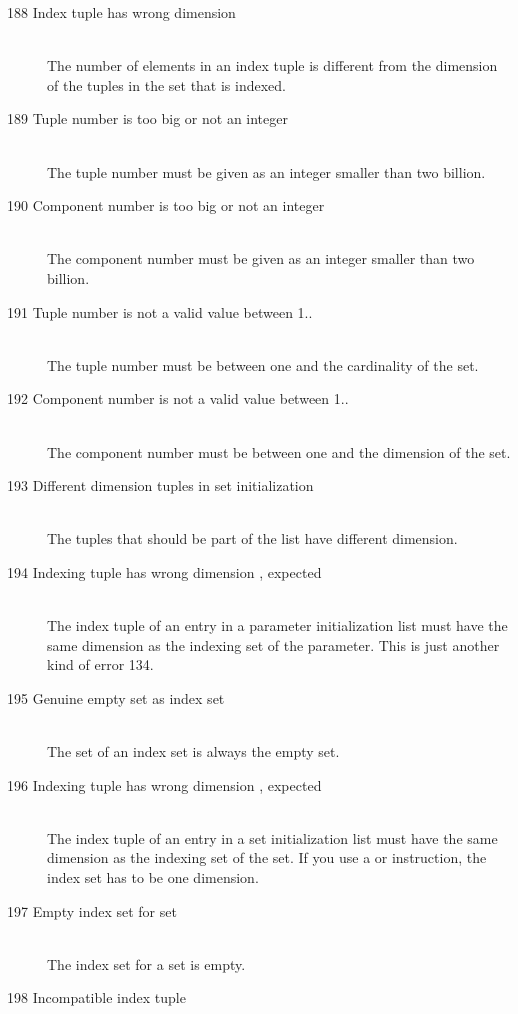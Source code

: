 \begin{description}
\item[188 Index tuple has wrong dimension]\ \\
   The number of elements in an index tuple is different from the
   dimension of the tuples in the set that is indexed.
\item[189 Tuple number  is too big or not an integer]\ \\
  The tuple number must be given as an integer smaller than two
  billion.
\item[190 Component number  is too big or not an integer]\ \\
  The component number must be given as an integer smaller than two
  billion.
\item[191 Tuple number  is not a valid value between 1..]\ \\
  The tuple number must be between one and the cardinality of the set.
\item[192 Component number  is not a valid value between 1..]\ \\
  The component number must be between one and the dimension of the set.
\item[193 Different dimension tuples in set initialization]\ \\
  The tuples that should be part of the list have different dimension.
\item[194 Indexing tuple  has wrong dimension
           , expected ]\ \\
  The index tuple of an entry in a parameter initialization list must
  have the same dimension as the indexing set of the parameter. This
  is just another kind of error 134.
\item[195 Genuine empty set as index set]\ \\
  The set of an index set is always the empty set.
\item[196 Indexing tuple  has wrong dimension
           , expected ]\ \\
  The index tuple of an entry in a set initialization list must
  have the same dimension as the indexing set of the set. 
  If you use a  or  instruction, the index
  set has to be one dimension.
\item[197 Empty index set for set]\ \\
  The index set for a set is empty.
\item[198 Incompatible index tuple]\ \\

\end{description}
